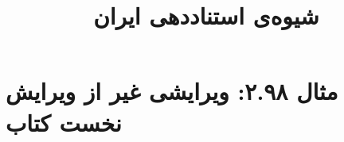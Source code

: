 \documentclass[a4paper,10pt]{article}
\begin{document}
\title{شیوه‌ی استناددهی ایران
 }
\author{}
\date{}
\maketitle



\section*{مثال ۲.۹۸: ویرایشی غیر از ویرایش نخست کتاب}

\cite{ماهبان1354}\\
\cite{سینایی1382}\\
\cite{anderson1982}\\
\cite{weber1928}\\






\end{document}
